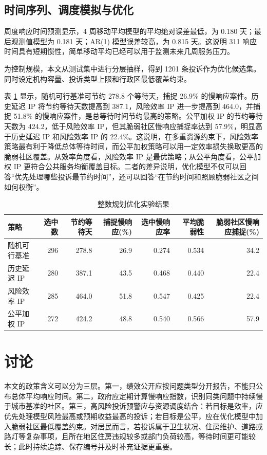 \documentclass[UTF8,a4paper,12pt]{ctexart}
\begin{document}
\subsection{时间序列、调度模拟与优化}

周度响应时间预测显示，4 周移动平均模型的平均绝对误差最低，为 0.180 天；最后观测值模型为 0.181 天；AR(1) 模型误差较高，为 0.815 天。这说明 311 响应时间具有短期惯性，简单移动平均已经可以用于监测未来几周服务压力。

为控制规模，本文从测试集中进行分层抽样，得到 1201 条投诉作为优化候选集。同时设定机构容量、投诉类型上限和行政区最低覆盖约束。

表 \ref{tab:ip_results} 显示，随机可行基准可节约 278.8 个等待天，捕捉 26.9\% 的慢响应案件。历史延迟 IP 将节约等待天数提高到 387.1，风险效率 IP 进一步提高到 464.0，并捕捉 51.8\% 的慢响应案件，是总等待时间节约最高的策略。公平加权 IP 的节约等待天数为 424.2，低于风险效率 IP，但其脆弱社区慢响应捕捉率达到 57.9\%，明显高于历史延迟 IP 和风险效率 IP 的 22.4\%。这说明，在多重资源约束下，风险效率策略最有利于降低总体等待时间，而公平加权策略可以用一定效率损失换取更高的脆弱社区覆盖。从效率角度看，风险效率 IP 是最优策略；从公平角度看，公平加权 IP 更符合公共服务均衡覆盖目标。二者的差异说明，优化模型不仅可以回答“优先处理哪些投诉最节约时间”，还可以回答“在节约时间和照顾脆弱社区之间如何权衡”。

\begin{table}[H]
\centering
\scriptsize
\caption{整数规划优化实验结果}
\label{tab:ip_results}
\begin{tabular}{lrrrrrr}
\toprule
策略 & 选中数 & 节约等待天 & 捕捉慢响应(\%) & 选中慢响应率 & 平均脆弱性 & 脆弱社区慢响应捕捉(\%)\\
\midrule
随机可行基准 & 296 & 278.8 & 26.9 & 0.274 & 0.534 & 34.2\\
历史延迟 IP & 280 & 387.1 & 43.5 & 0.468 & 0.440 & 22.4\\
风险效率 IP & 285 & 464.0 & 51.8 & 0.547 & 0.425 & 22.4\\
公平加权 IP & 272 & 424.2 & 48.8 & 0.540 & 0.566 & 57.9\\
\bottomrule
\end{tabular}
\end{table}

\section{讨论}

本文的政策含义可以分为三层。第一，绩效公开应按问题类型分开报告，不能只公布总体平均响应时间。第二，政府应定期计算慢响应指数，识别同类问题中持续慢于城市基准的社区。第三，高风险投诉预警应与资源调度结合：若目标是效率，应优先处理模型风险最高或预期收益最高的投诉；若目标是公平，应在优化模型中加入脆弱社区最低覆盖约束。对居民而言，若投诉属于卫生状况、住房维护、道路或路灯等复杂事项，且所在地区住房违规较多或部门负荷较高，等待时间更可能较长；此时持续追踪、保存编号并及时补充证据更重要。
\end{document}

